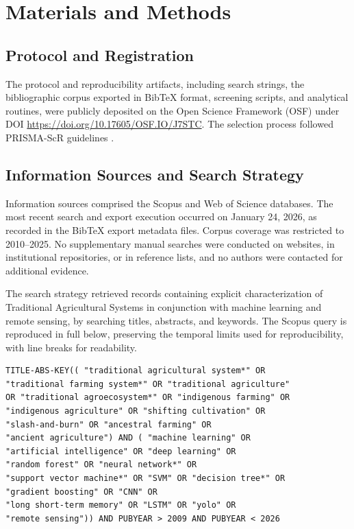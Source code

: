 \documentclass[lineno,pdflatex,sn-apa]{sn-jnl}
\begin{document}
\section{Materials and Methods}

\subsection{Protocol and Registration}

The protocol and reproducibility artifacts, including search strings, the bibliographic corpus exported in BibTeX format, screening scripts, and analytical routines, were publicly deposited on the Open Science Framework (OSF) under DOI \url{https://doi.org/10.17605/OSF.IO/J7STC}. The selection process followed PRISMA-ScR guidelines \citep{Tricco2018b}.

\subsection{Information Sources and Search Strategy}

Information sources comprised the Scopus and Web of Science databases. The most recent search and export execution occurred on January 24, 2026, as recorded in the BibTeX export metadata files. Corpus coverage was restricted to 2010--2025. No supplementary manual searches were conducted on websites, in institutional repositories, or in reference lists, and no authors were contacted for additional evidence.

The search strategy retrieved records containing explicit characterization of Traditional Agricultural Systems in conjunction with machine learning and remote sensing, by searching titles, abstracts, and keywords. The Scopus query is reproduced in full below, preserving the temporal limits used for reproducibility, with line breaks for readability.

{\small
\begin{verbatim}
TITLE-ABS-KEY(( "traditional agricultural system*" OR
"traditional farming system*" OR "traditional agriculture"
OR "traditional agroecosystem*" OR "indigenous farming" OR
"indigenous agriculture" OR "shifting cultivation" OR
"slash-and-burn" OR "ancestral farming" OR
"ancient agriculture") AND ( "machine learning" OR
"artificial intelligence" OR "deep learning" OR
"random forest" OR "neural network*" OR
"support vector machine*" OR "SVM" OR "decision tree*" OR
"gradient boosting" OR "CNN" OR
"long short-term memory" OR "LSTM" OR "yolo" OR
"remote sensing")) AND PUBYEAR > 2009 AND PUBYEAR < 2026
\end{verbatim}
}
\end{document}
